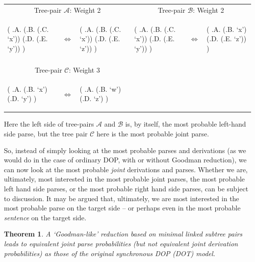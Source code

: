 \documentclass[a4paper]{article}
\newtheorem{theorem}{Theorem}[section]
\theoremstyle{definition}
\begin{document}
\begin{tabular}{llllll}
\multicolumn{3}{c}{Tree-pair $\mathcal{A}$: Weight 2} &
\multicolumn{3}{c}{Tree-pair $\mathcal{B}$: Weight 2} \\
\begin{parsetree}
( .A.
    (.B. (.C. `x'))
    (.D. (.E. `y'))
)
\end{parsetree}
& $\iff$ &
\begin{parsetree}
( .A.
    (.B. (.C. `x'))
    (.D. (.E. `z'))
)
\end{parsetree}
&
\begin{parsetree}
( .A.
    (.B. (.C. `x'))
    (.D. (.E. `y'))
)
\end{parsetree}
& $\iff$ &
\begin{parsetree}
( .A.
    (.B. `x')
    (.D. (.E. `z'))
)
\end{parsetree} \\
& & \\
\multicolumn{3}{c}{Tree-pair $\mathcal{C}$: Weight 3} & \\
\begin{parsetree}
( .A.
    (.B. `x')
    (.D. `y')
)
\end{parsetree}
& $\iff$ &
\begin{parsetree}
( .A.
    (.B. `w')
    (.D. `z')
)
\end{parsetree}

\end{tabular}
\vspace{1em}

Here the left side of tree-pairs $\mathcal{A}$ and $\mathcal{B}$ is, by itself, the
most probable left-hand side parse, but the tree pair $\mathcal{C}$ here is the
most probable joint parse.

So, instead of simply looking at the most probable parses and derivations (as we would do in the case of ordinary DOP, with or without Goodman reduction), we can now look at the most probable \emph{joint} derivations and parses. Whether we are, ultimately, most interested in the most probable joint parses, the most probable left hand side parses, or the most probable right hand side parses, can be subject to discussion. It may be argued that, ultimately, we are most interested in the most probable parse on the target side -- or perhaps even in the most probable \emph{sentence} on the target side.

\begin{theorem}
A `Goodman-like' reduction based on minimal linked subtree pairs leads to
equivalent joint parse probabilities (but not equivalent joint derivation
probabilities) as those of the original synchronous DOP (DOT) model.
\end{theorem}
\end{document}
